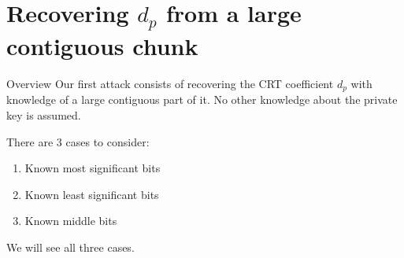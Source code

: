 \documentclass[usepdftitle=false]{beamer}
\begin{document}
\section{Recovering $d_p$ from a large contiguous chunk}
\begin{frame}{Overview}
Our first attack consists of recovering the CRT coefficient $d_p$ with knowledge
of a large contiguous part of it. No other knowledge about the private key is assumed.
\vspace{10pt}

There are 3 cases to consider:
\begin{enumerate}
    \item Known most significant bits
    \item Known least significant bits
    \item Known middle bits
\end{enumerate}

We will see all three cases.
\end{frame}
\end{document}
